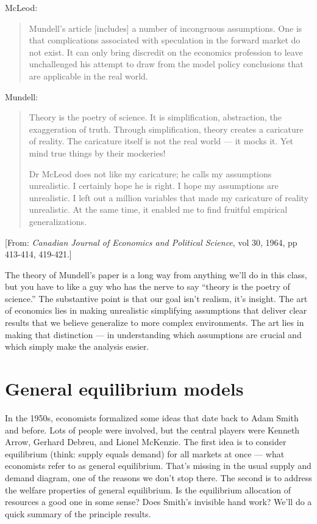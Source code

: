 \documentclass[11pt]{article}
\begin{document}
McLeod:
\begin{quote}
Mundell's article [includes] a number of incongruous assumptions.
One is that complications associated with speculation in the forward market do not exist.
It can only bring discredit on the economics profession to leave unchallenged
his attempt to draw from the model policy conclusions that are applicable in the real world.
\end{quote}
Mundell:
\begin{quote}
Theory is the poetry of science.
It is simplification, abstraction, the exaggeration of truth.
Through simplification, theory creates a caricature of reality.
The caricature itself is not the real world --- it mocks it.
Yet mind true things by their mockeries!

Dr McLeod does not like my caricature; he calls my assumptions unrealistic.
I certainly hope he is right.  I hope my assumptions are unrealistic.
I left out a million variables that made my caricature of reality unrealistic.
At the same time, it enabled me to find fruitful empirical generalizations.
\end{quote}
%
[From:  {\it Canadian Journal of Economics and Political Science\/}, vol 30, 1964, pp 413-414, 419-421.]

The theory of Mundell's paper is a long way from anything
we'll do in this class,
but you have to like a guy who has the nerve to say
``theory is the poetry of science.''
The substantive point is that our goal isn't realism, it's insight.
The art of economics lies in making unrealistic simplifying assumptions that
deliver clear results that we believe generalize to more complex environments.
The art lies in making that distinction ---
in understanding which assumptions are crucial and
which simply make the analysis easier.


\section{General equilibrium models}

In the 1950s, economists formalized some ideas that date back to Adam Smith and before.
Lots of people were involved, but the central players
were Kenneth Arrow, Gerhard Debreu, and Lionel McKenzie.
The first idea is to consider equilibrium (think: supply equals demand)
for all markets at once ---
what economists refer to as general equilibrium.
That's missing in the usual supply and demand diagram,
one of the reasons we don't stop there.
The second is to address the welfare properties of general equilibrium.
Is the equilibrium allocation of resources a good one in some sense?
Does Smith's invisible hand work?
We'll do a quick summary of the principle results.
\end{document}
